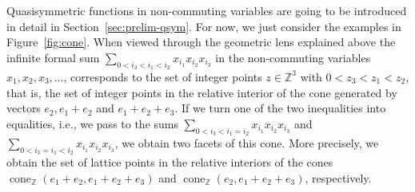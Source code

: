 \documentclass[12pt]{amsart}
\newcommand{\ZZ}{\mathbb{Z}}
\newcommand{\cone}{\operatorname{cone}}
\begin{document}
Quasisymmetric functions in non-commuting variables are going to be introduced in detail in Section~\ref{sec:prelim-qsym}. For now, we just consider the examples in Figure~\ref{fig:cone}. When viewed through the geometric lens explained above the infinite formal sum $\sum_{0<i_3<i_1<i_2} x_{i_1}x_{i_2}x_{i_3}$ in the non-commuting variables $x_1,x_2,x_3,\ldots$, corresponds to the set of integer points $z\in\ZZ^3$ with $0<z_3<z_1<z_2$, that is, the set of integer points in the relative interior of the cone generated by vectors $e_2,e_1+e_2$ and $e_1+e_2+e_3$. If we turn one of the two inequalities into equalities, i.e., we pass to the sums $\sum_{0<i_3<i_1 = i_2} x_{i_1}x_{i_2}x_{i_3}$ and $\sum_{0<i_3=i_1<i_2} x_{i_1}x_{i_2}x_{i_3}$, we obtain two facets of this cone. More precisely, we obtain the set of lattice points in the relative interiors of the cones $\cone_\ZZ(e_1+e_2,e_1+e_2+e_3)$ and $\cone_\ZZ(e_2,e_1+e_2+e_3)$, respectively.
\end{document}
